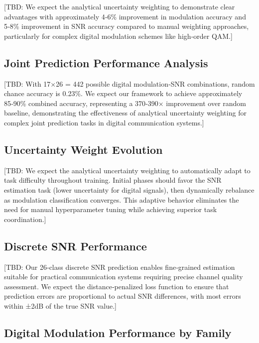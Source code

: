 \documentclass{ELSP}
\begin{document}
[TBD: We expect the analytical uncertainty weighting to demonstrate clear advantages with approximately 4‑6\% improvement in modulation accuracy and 5‑8\% improvement in SNR accuracy compared to manual weighting approaches, particularly for complex digital modulation schemes like high‑order QAM.]

\subsection{Joint Prediction Performance Analysis}

[TBD: With 17×26 = 442 possible digital modulation‑SNR combinations, random chance accuracy is 0.23\%. We expect our framework to achieve approximately 85‑90\% combined accuracy, representing a 370‑390× improvement over random baseline, demonstrating the effectiveness of analytical uncertainty weighting for complex joint prediction tasks in digital communication systems.]

\subsection{Uncertainty Weight Evolution}

[TBD: We expect the analytical uncertainty weighting to automatically adapt to task difficulty throughout training. Initial phases should favor the SNR estimation task (lower uncertainty for digital signals), then dynamically rebalance as modulation classification converges. This adaptive behavior eliminates the need for manual hyperparameter tuning while achieving superior task coordination.]

\subsection{Discrete SNR Performance}

[TBD: Our 26‑class discrete SNR prediction enables fine‑grained estimation suitable for practical communication systems requiring precise channel quality assessment. We expect the distance‑penalized loss function to ensure that prediction errors are proportional to actual SNR differences, with most errors within ±2dB of the true SNR value.]

\subsection{Digital Modulation Performance by Family}
\end{document}
